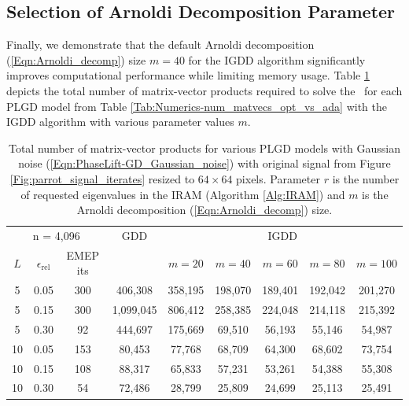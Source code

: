 \subsection{Selection of Arnoldi Decomposition Parameter}		\label{Subsec:Numerics-perf_results_emp_arnoldi_param}

Finally, we demonstrate that the default Arnoldi decomposition (\ref{Eqn:Arnoldi_decomp}) size $m=40$ for the IGDD algorithm significantly improves computational performance while limiting memory usage.
Table \ref{Tab:Numerics-num_matvecs_orig_vs_ada} depicts the total number of matrix-vector products required to solve the \emep \ for each PLGD model from Table \ref{Tab:Numerics-num_matvecs_opt_vs_ada} with the IGDD algorithm with various parameter values $m$.

\begin{table}[H]
\centering
\begin{tabular}{ |ccc|c|ccccc| }
 \hline
			  \multicolumn{3}{|c|}{n = 4,096} & GDD 
			&  \multicolumn{5}{c|}{IGDD }	\\
$L$ & $\epsilon_\text{rel}$ & EMEP its & 	& $m=20$  & $m=40$  & $m=60$  & $m=80$  & $m=100$   \\
 \hline
  5 &  0.05 & 300 &  406,308  &  358,195  &  198,070  &  189,401  &  192,042  &  201,270  \\ 
  5 &  0.15 & 300 & 1,099,045  &  806,412  &  258,385  &  224,048  &  214,118  &  215,392  \\ 
  5 &  0.30 &  92 &  444,697  &  175,669  &   69,510  &   56,193  &   55,146  &   54,987  \\ 
 10 &  0.05 & 153 &   80,453  &   77,768  &   68,709  &   64,300  &   68,602  &   73,754  \\ 
 10 &  0.15 & 108 &   88,317  &   65,833  &   57,231  &   53,261  &   54,388  &   55,308  \\ 
 10 &  0.30 &  54 &   72,486  &   28,799  &   25,809  &   24,699  &   25,113  &   25,491  \\ 
 \hline
\end{tabular}
\vspace{0.5cm}
\caption{
Total number of matrix-vector products for various PLGD models with Gaussian noise	(\ref{Eqn:PhaseLift-GD_Gaussian_noise}) with original signal from Figure \ref{Fig:parrot_signal_iterates} resized to $64 \times 64$ pixels.
Parameter $r$ is the number of requested eigenvalues in the IRAM (Algorithm \ref{Alg:IRAM}) and $m$ is the Arnoldi decomposition (\ref{Eqn:Arnoldi_decomp}) size. 
} \label{Tab:Numerics-num_matvecs_orig_vs_ada}
\end{table}



